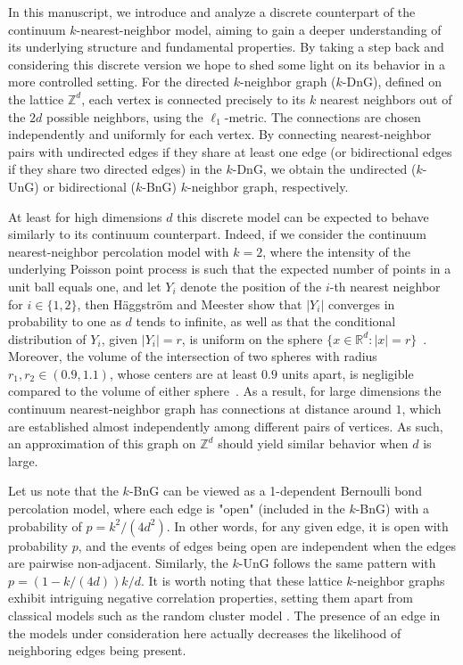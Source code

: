 \documentclass[a4paper, oneside, 11pt]{amsart}
\theoremstyle{definition}
\newcommand{\1}{\mathbbm{1}}
\newcommand{\0}{\mathbf{o}}
\newcommand{\R}{\mathbb{R}}
\newcommand{\Z}{\mathbb{Z}}
\numberwithin{equation}{section}
\begin{document}
In this manuscript, we introduce and analyze a discrete counterpart of the continuum $k$-nearest-neighbor model, aiming to gain a deeper understanding of its underlying structure and fundamental properties. By taking a step back and considering this discrete version we hope to shed some light on its behavior in a more controlled setting. 
For the directed $k$-neighbor graph ($k$-DnG), defined on the lattice $\mathbb{Z}^d$, each vertex is connected precisely to its $k$ nearest neighbors out of the $2d$ possible neighbors, using the $\ell_1$-metric. The connections are chosen independently and uniformly for each vertex. By connecting nearest-neighbor pairs with undirected edges if they share at least one edge (or bidirectional edges if they share two directed edges) in the $k$-DnG, we obtain the undirected ($k$-UnG) or bidirectional ($k$-BnG) $k$-neighbor graph, respectively.

At least for high dimensions $d$ this discrete model can be expected to behave similarly to its continuum counterpart.
Indeed, if we consider the continuum nearest-neighbor percolation model with $k=2$, where the intensity of the underlying Poisson point process is such that the expected number of points in a unit ball equals one, and let $Y_i$ denote the position of the $i$-th nearest neighbor for $i\in\{1,2\}$, then H\"aggström and Meester show that $|Y_i|$ converges in probability to one as $d$ tends to infinite, as well as that the conditional distribution of $Y_i$, given $|Y_i|=r$, is uniform on the sphere $\{x\in \R^d: |x|=r\}$~\cite[Lemma $3.2$]{HaggMee96}. Moreover, the volume of the intersection of two spheres with radius $r_1,r_2\in(0.9,1.1)$, whose centers are at least $0.9$ units apart, is negligible compared to the volume of either sphere~\cite[Lemma $3.3$]{HaggMee96}. As a result, for large dimensions the continuum nearest-neighbor graph has connections at distance around $1$, which are established almost independently among different pairs of vertices. As such, an approximation of this graph on $\Z^d$ should yield similar behavior when $d$ is large. 

Let us note that the $k$-BnG can be viewed as a 1-dependent Bernoulli bond percolation model, where each edge is "open" (included in the $k$-BnG) with a probability of $p = k^2/(4d^2)$. In other words, for any given edge, it is open with probability $p$, and the events of edges being open are independent when the edges are pairwise non-adjacent. Similarly, the $k$-UnG follows the same pattern with $p = (1-k/(4d))k/d$. It is worth noting that these lattice $k$-neighbor graphs exhibit intriguing negative correlation properties, setting them apart from classical models such as the random cluster model \cite{grimmett2006random}. The presence of an edge in the models under consideration here actually decreases the likelihood of neighboring edges being present.
\end{document}
